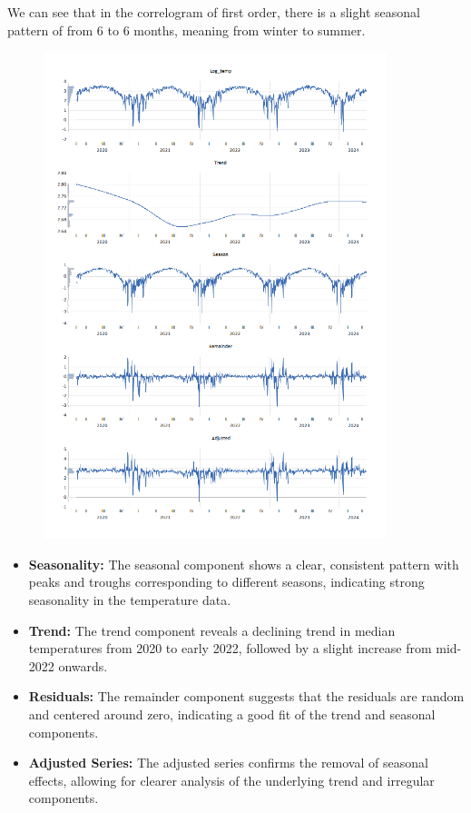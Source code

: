 \documentclass{article} %
\begin{document}
We can see that in the correlogram of first order, there is a slight seasonal pattern of from 6 to 6 months, meaning from winter to summer.

\begin{figure}[H]
\centering
\includegraphics[width=10cm]{images/image23.png}
\end{figure}

\begin{itemize}
    \item \textbf{Seasonality:} The seasonal component shows a clear, consistent pattern with peaks and troughs corresponding to different seasons, indicating strong seasonality in the temperature data.
    \item \textbf{Trend:} The trend component reveals a declining trend in median temperatures from 2020 to early 2022, followed by a slight increase from mid-2022 onwards.
    \item \textbf{Residuals:} The remainder component suggests that the residuals are random and centered around zero, indicating a good fit of the trend and seasonal components.
    \item \textbf{Adjusted Series:} The adjusted series confirms the removal of seasonal effects, allowing for clearer analysis of the underlying trend and irregular components.
\end{itemize}
\end{document}
